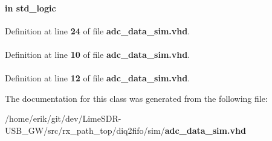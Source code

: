 \paragraph[{reset\+\_\+n}]{ {\bfseries \textcolor{keywordflow}{in}\textcolor{vhdlchar}{ }} {\bfseries \textcolor{comment}{std\+\_\+logic}\textcolor{vhdlchar}{ }} \hspace{0.3cm}{\ttfamily [Port]}}\label{classadc__data__sim_a446ea52ed8c4a84181a47d9165ce41a5}


Definition at line {\bf 24} of file {\bf adc\+\_\+data\+\_\+sim.\+vhd}.

\paragraph[{std\+\_\+logic\+\_\+1164}]{\hspace{0.3cm}{\ttfamily [Package]}}\label{classadc__data__sim_acd03516902501cd1c7296a98e22c6fcb}


Definition at line {\bf 10} of file {\bf adc\+\_\+data\+\_\+sim.\+vhd}.

\paragraph[{textio}]{\hspace{0.3cm}{\ttfamily [Package]}}\label{classadc__data__sim_aa8c4e25998323a84db5b1fa701b92fcb}


Definition at line {\bf 12} of file {\bf adc\+\_\+data\+\_\+sim.\+vhd}.



The documentation for this class was generated from the following file\+:\begin{DoxyCompactItemize}
\item 
/home/erik/git/dev/\+Lime\+S\+D\+R-\/\+U\+S\+B\+\_\+\+G\+W/src/rx\+\_\+path\+\_\+top/diq2fifo/sim/{\bf adc\+\_\+data\+\_\+sim.\+vhd}\end{DoxyCompactItemize}

